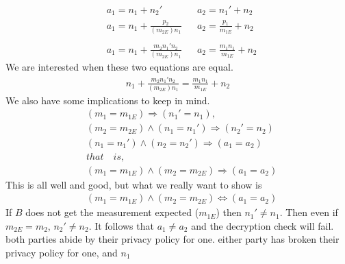 \documentclass[10pt,a4paper,tikz]{article}
\begin{document}
\begin{align*}
&a_1 = n_1 + n_2' &&a_2 = n_1' + n_2 \\
&a_1 = n_1 + \frac{p_2}{(m_{2E})n_1} &&a_2 = \frac{p_1}{m_{1E}} + n_2 \\
\\
&a_1 = n_1 + \frac{m_2n_1'n_2}{(m_{2E})n_1} &&a_2 = \frac{m_1n_1}{m_{1E}} + n_2
\end{align*}
We are interested when these two equations are equal.
\begin{align*}
n_1 + \frac{m_2n_1'n_2}{(m_{2E})n_1} = \frac{m_1n_1}{m_{1E}} + n_2
\end{align*}
We also have some implications to keep in mind.
\begin{align*}
&(m_1 = m_{1E}) \Longrightarrow (n_1' = n_1),\\
&(m_2 = m_{2E}) \land (n_1 = n_1') \Longrightarrow (n_2' = n_2)\\
&(n_1 = n_1') \land (n_2 = n_2') \Longrightarrow (a_1 = a_2)\\
&that \quad is,\\
&(m_1 = m_{1E}) \land (m_2 = m_{2E}) \Longrightarrow (a_1 = a_2) 
\end{align*}
This is all well and good, but what we really want to show is
\begin{align*}
&(m_1 = m_{1E}) \land (m_2 = m_{2E}) \Longleftrightarrow (a_1 = a_2) 
\end{align*}
If $B$ does not get the measurement expected ($m_{1E}$) then $n_1' \neq n_1$. Then even if $m_{2E} = m_2$, $n_2' \neq n_2$. It follows that $a_1 \neq a_2$ and the decryption check will fail.   both parties abide by their privacy policy for one. either party has broken their privacy policy for one, and $n_1$ 


 
 
\end{document}
